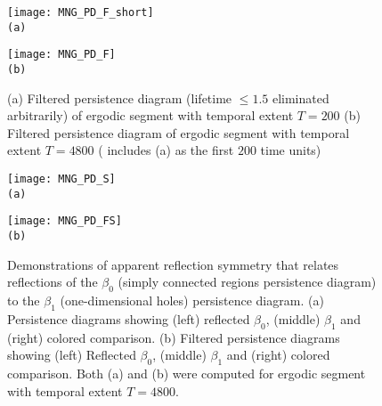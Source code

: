 \begin{description}
\begin{figure}
\begin{minipage}[height=.32\textheight]{.9\textwidth}
\centering
\texttt{[image: MNG\_PD\_F\_short]}\\
\small{\texttt{(a)}}
\end{minipage}
\begin{minipage}[height=.32\textheight]{.9\textwidth}
\centering
\texttt{[image: MNG\_PD\_F]}\\
\small{\texttt{(b)}}
\end{minipage}
\caption{ \label{fig:MNG_PD_F}
(a) Filtered persistence diagram (lifetime $\leq 1.5$ eliminated arbitrarily)
    of ergodic segment with temporal extent $T=200$
(b) Filtered persistence diagram
   of ergodic segment with temporal extent $T=4800$ ( includes (a) as
   the first $200$ time units)
}
\end{figure}

\begin{figure}
\begin{minipage}[height=.32\textheight]{1.0\textwidth}
\centering
\texttt{[image: MNG\_PD\_S]}\\
\small{\texttt{(a)}}
\end{minipage}
\begin{minipage}[height=.32\textheight]{1.0\textwidth}
\centering
\texttt{[image: MNG\_PD\_FS]}\\
\small{\texttt{(b)}}
\end{minipage}
\caption{ \label{fig:MNG_PD_S}
Demonstrations of apparent reflection symmetry that relates reflections of the $\beta_0$ (simply connected regions persistence diagram) to
the $\beta_1$ (one-dimensional holes) persistence diagram.
(a) Persistence diagrams showing (left) reflected $\beta_0$, (middle) $\beta_1$ and (right) colored comparison.
(b) Filtered persistence diagrams showing (left) Reflected $\beta_0$, (middle) $\beta_1$ and (right) colored comparison.
Both (a) and (b) were computed for ergodic segment with temporal extent $T=4800$.
}
\end{figure}

\end{description}
